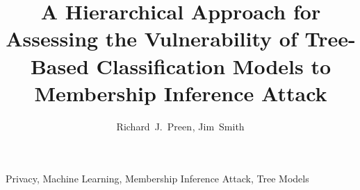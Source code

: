 \documentclass{tdp}
\begin{document}
\title{A Hierarchical Approach for Assessing the Vulnerability of Tree-Based Classification Models to Membership Inference Attack}

\author{Richard~J.~Preen$^{}$, Jim~Smith$^{}$}

\address{$^{}$%
Department of Computer Science and Creative Technologies,
University of the West of England, Bristol, UK\@.\\ 
E-mail: {\small \tt{\{richard2.preen,james.smith\}@uwe.ac.uk}}
}



\maketitle



\begin{keywords}
Privacy, Machine Learning, Membership Inference Attack, Tree Models
\end{keywords}





 






\end{document}
